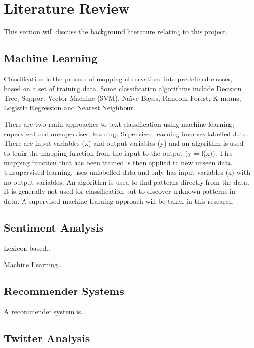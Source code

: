 \chapter{Literature Review}

This section will discuss the background literature relating to this project.

\section{Machine Learning}

\begin{justify}
Classification is the process of mapping observations into predefined classes, based on a set of training data. Some classification algorithms include Decision Tree, Support Vector Machine (SVM), Naïve Bayes, Random Forest, K-means, Logistic Regression and Nearest Neighbour.

There are two main approaches to text classification using machine learning; supervised and unsupervised learning. Supervised learning involves labelled data. There are input variables (x) and output variables (y) and an algorithm is used to train the mapping function from the input to the output (y = f(x)). This mapping function that has been trained is then applied to new unseen data. Unsupervised learning, uses unlabelled data and only has input variables (x) with no output variables. An algorithm is used to find patterns directly from the data. It is generally not used for classification but to discover unknown patterns in data. A supervised machine learning approach will be taken in this research.
\end{justify}

\section{Sentiment Analysis}

Lexicon based..

Machine Learning..

\section{Recommender Systems}

A recommender system is...

\section{Twitter Analysis}

